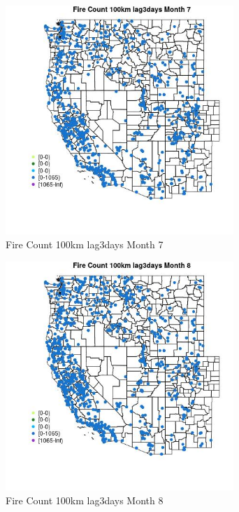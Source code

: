\begin{figure} 
\centering  
\includegraphics[width=0.77\textwidth]{Code_Outputs/Report_ML_input_PM25_Step4_part_f_de_duplicated_aves_prioritize_24hr_obswNAs_MapObsMo7Fire_Count_100km_lag3days.jpg} 
\caption{\label{fig:Report_ML_input_PM25_Step4_part_f_de_duplicated_aves_prioritize_24hr_obswNAsMapObsMo7Fire_Count_100km_lag3days}Fire Count 100km lag3days Month 7} 
\end{figure} 
 

\begin{figure} 
\centering  
\includegraphics[width=0.77\textwidth]{Code_Outputs/Report_ML_input_PM25_Step4_part_f_de_duplicated_aves_prioritize_24hr_obswNAs_MapObsMo8Fire_Count_100km_lag3days.jpg} 
\caption{\label{fig:Report_ML_input_PM25_Step4_part_f_de_duplicated_aves_prioritize_24hr_obswNAsMapObsMo8Fire_Count_100km_lag3days}Fire Count 100km lag3days Month 8} 
\end{figure} 
 

